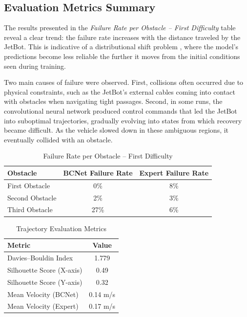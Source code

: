 \subsection{Evaluation Metrics Summary}

The results presented in the \textit{Failure Rate per Obstacle – First Difficulty} table reveal a clear trend: the failure rate increases with the distance traveled by the JetBot. This is indicative of a distributional shift problem \autocite{codevilla2019exploring}, where the model's predictions become less reliable the further it moves from the initial conditions seen during training.

Two main causes of failure were observed. First, collisions often occurred due to physical constraints, such as the JetBot's external cables coming into contact with obstacles when navigating tight passages. Second, in some runs, the convolutional neural network produced control commands that led the JetBot into suboptimal trajectories, gradually evolving into states from which recovery became difficult. As the vehicle slowed down in these ambiguous regions, it eventually collided with an obstacle.

\begin{table}[H]
  \centering
  \caption{Failure Rate per Obstacle – First Difficulty}
  \begin{tabular}{|l|c|c|}
    \hline
    \textbf{Obstacle}      & \textbf{BCNet Failure Rate} & \textbf{Expert Failure Rate} \\
    \hline
    First Obstacle         & 0\%                         & 8\%                           \\
    Second Obstacle        & 2\%                         & 3\%                           \\
    Third Obstacle         & 27\%                        & 6\%                           \\
    \hline
  \end{tabular}
\end{table}

\begin{table}[H]
  \centering
  \caption{Trajectory Evaluation Metrics}
  \label{tab:evaluation_metrics}
  \begin{tabular}{|l|c|}
    \hline
    \textbf{Metric} & \textbf{Value} \\
    \hline
    Davies–Bouldin Index & 1.779 \\
    Silhouette Score (X-axis) & 0.49 \\
    Silhouette Score (Y-axis) & 0.32 \\
    Mean Velocity (BCNet) & 0.14 m/s \\
    Mean Velocity (Expert) & 0.17 m/s \\
    \hline
  \end{tabular}
\end{table}

